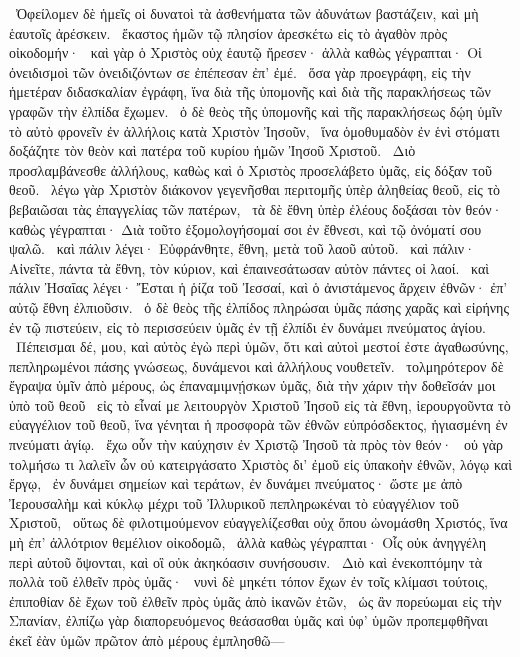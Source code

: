 ~Ὀφείλομεν δὲ ἡμεῖς οἱ δυνατοὶ τὰ ἀσθενήματα τῶν ἀδυνάτων βαστάζειν, καὶ μὴ ἑαυτοῖς ἀρέσκειν.
~ἕκαστος ἡμῶν τῷ πλησίον ἀρεσκέτω εἰς τὸ ἀγαθὸν πρὸς οἰκοδομήν·
~καὶ γὰρ ὁ Χριστὸς οὐχ ἑαυτῷ ἤρεσεν· ἀλλὰ καθὼς γέγραπται· Οἱ ὀνειδισμοὶ τῶν ὀνειδιζόντων σε ἐπέπεσαν ἐπ’ ἐμέ.
~ὅσα γὰρ προεγράφη, εἰς τὴν ἡμετέραν διδασκαλίαν ἐγράφη, ἵνα διὰ τῆς ὑπομονῆς καὶ διὰ τῆς παρακλήσεως τῶν γραφῶν τὴν ἐλπίδα ἔχωμεν.
~ὁ δὲ θεὸς τῆς ὑπομονῆς καὶ τῆς παρακλήσεως δῴη ὑμῖν τὸ αὐτὸ φρονεῖν ἐν ἀλλήλοις κατὰ Χριστὸν Ἰησοῦν,
~ἵνα ὁμοθυμαδὸν ἐν ἑνὶ στόματι δοξάζητε τὸν θεὸν καὶ πατέρα τοῦ κυρίου ἡμῶν Ἰησοῦ Χριστοῦ.
~Διὸ προσλαμβάνεσθε ἀλλήλους, καθὼς καὶ ὁ Χριστὸς προσελάβετο ὑμᾶς, εἰς δόξαν τοῦ θεοῦ.
~λέγω γὰρ Χριστὸν διάκονον γεγενῆσθαι περιτομῆς ὑπὲρ ἀληθείας θεοῦ, εἰς τὸ βεβαιῶσαι τὰς ἐπαγγελίας τῶν πατέρων,
~τὰ δὲ ἔθνη ὑπὲρ ἐλέους δοξάσαι τὸν θεόν· καθὼς γέγραπται· Διὰ τοῦτο ἐξομολογήσομαί σοι ἐν ἔθνεσι, καὶ τῷ ὀνόματί σου ψαλῶ.
~καὶ πάλιν λέγει· Εὐφράνθητε, ἔθνη, μετὰ τοῦ λαοῦ αὐτοῦ.
~καὶ πάλιν· Αἰνεῖτε, πάντα τὰ ἔθνη, τὸν κύριον, καὶ ἐπαινεσάτωσαν αὐτὸν πάντες οἱ λαοί.
~καὶ πάλιν Ἠσαΐας λέγει· Ἔσται ἡ ῥίζα τοῦ Ἰεσσαί, καὶ ὁ ἀνιστάμενος ἄρχειν ἐθνῶν· ἐπ’ αὐτῷ ἔθνη ἐλπιοῦσιν.
~ὁ δὲ θεὸς τῆς ἐλπίδος πληρώσαι ὑμᾶς πάσης χαρᾶς καὶ εἰρήνης ἐν τῷ πιστεύειν, εἰς τὸ περισσεύειν ὑμᾶς ἐν τῇ ἐλπίδι ἐν δυνάμει πνεύματος ἁγίου.
~Πέπεισμαι δέ,  μου, καὶ αὐτὸς ἐγὼ περὶ ὑμῶν, ὅτι καὶ αὐτοὶ μεστοί ἐστε ἀγαθωσύνης, πεπληρωμένοι πάσης γνώσεως, δυνάμενοι καὶ ἀλλήλους νουθετεῖν.
~τολμηρότερον δὲ ἔγραψα ὑμῖν ἀπὸ μέρους, ὡς ἐπαναμιμνῄσκων ὑμᾶς, διὰ τὴν χάριν τὴν δοθεῖσάν μοι ὑπὸ τοῦ θεοῦ
~εἰς τὸ εἶναί με λειτουργὸν Χριστοῦ Ἰησοῦ εἰς τὰ ἔθνη, ἱερουργοῦντα τὸ εὐαγγέλιον τοῦ θεοῦ, ἵνα γένηται ἡ προσφορὰ τῶν ἐθνῶν εὐπρόσδεκτος, ἡγιασμένη ἐν πνεύματι ἁγίῳ.
~ἔχω οὖν τὴν καύχησιν ἐν Χριστῷ Ἰησοῦ τὰ πρὸς τὸν θεόν·
~οὐ γὰρ τολμήσω τι λαλεῖν ὧν οὐ κατειργάσατο Χριστὸς δι’ ἐμοῦ εἰς ὑπακοὴν ἐθνῶν, λόγῳ καὶ ἔργῳ,
~ἐν δυνάμει σημείων καὶ τεράτων, ἐν δυνάμει πνεύματος· ὥστε με ἀπὸ Ἰερουσαλὴμ καὶ κύκλῳ μέχρι τοῦ Ἰλλυρικοῦ πεπληρωκέναι τὸ εὐαγγέλιον τοῦ Χριστοῦ,
~οὕτως δὲ φιλοτιμούμενον εὐαγγελίζεσθαι οὐχ ὅπου ὠνομάσθη Χριστός, ἵνα μὴ ἐπ’ ἀλλότριον θεμέλιον οἰκοδομῶ,
~ἀλλὰ καθὼς γέγραπται· Οἷς οὐκ ἀνηγγέλη περὶ αὐτοῦ ὄψονται, καὶ οἳ οὐκ ἀκηκόασιν συνήσουσιν.
~Διὸ καὶ ἐνεκοπτόμην τὰ πολλὰ τοῦ ἐλθεῖν πρὸς ὑμᾶς·
~νυνὶ δὲ μηκέτι τόπον ἔχων ἐν τοῖς κλίμασι τούτοις, ἐπιποθίαν δὲ ἔχων τοῦ ἐλθεῖν πρὸς ὑμᾶς ἀπὸ ἱκανῶν ἐτῶν,
~ὡς ἂν πορεύωμαι εἰς τὴν Σπανίαν, ἐλπίζω γὰρ διαπορευόμενος θεάσασθαι ὑμᾶς καὶ ὑφ’ ὑμῶν προπεμφθῆναι ἐκεῖ ἐὰν ὑμῶν πρῶτον ἀπὸ μέρους ἐμπλησθῶ—
